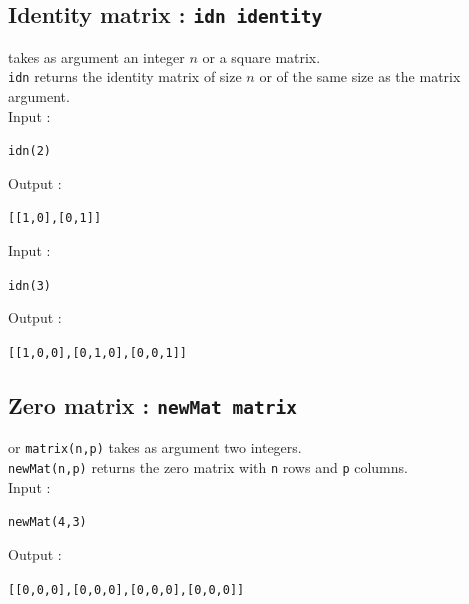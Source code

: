 \documentclass[a4paper,11pt]{book}
\begin{document}
\subsection{Identity matrix : {\tt idn identity}}
 takes as argument an integer $n$ or a square matrix.\\
{\tt idn} returns the identity matrix of size $n$ or of the same size
as the matrix argument.\\
Input :
\begin{center}{\tt idn(2)}\end{center}
Output :
\begin{center}{\tt  [[1,0],[0,1]]}\end{center}
Input :
\begin{center}{\tt idn(3)}\end{center}
Output :
\begin{center}{\tt  [[1,0,0],[0,1,0],[0,0,1]]}\end{center}

\subsection{Zero matrix : {\tt newMat matrix}}
 or {\tt matrix(n,p)}
takes as argument two integers.\\
{\tt newMat(n,p)} returns the zero matrix with {\tt n} rows and 
{\tt p} columns.\\
Input :
\begin{center}{\tt newMat(4,3)}\end{center}
Output :
\begin{center}{\tt[[0,0,0],[0,0,0],[0,0,0],[0,0,0]]}\end{center}
\end{document}
